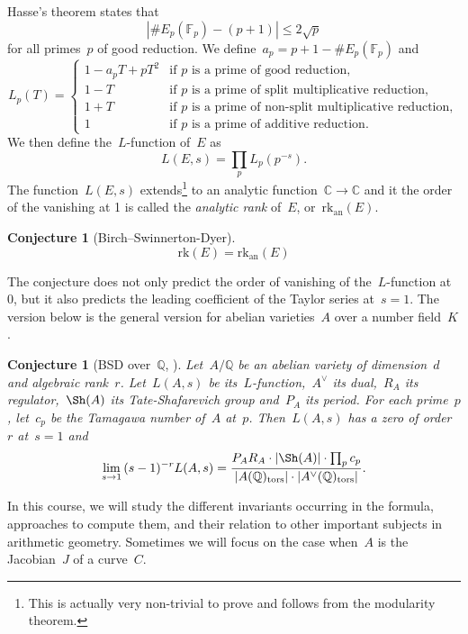 \documentclass[12pt]{article}
\newtheorem{conjecture}[theorem]{Conjecture}
\theoremstyle{definition}
\numberwithin{equation}{subsection}
\newcommand{\C}{\ensuremath{\mathbb{C}}}
\newcommand{\Q}{\ensuremath{\mathbb{Q}}}
\newcommand{\F}{\ensuremath{\mathbb{F}}}
\newcommand{\tors}{\mathrm{tors}}
\newcommand{\rkan}{\mathrm{rk}_{\mathrm{an}}}
\begin{document}
Hasse's theorem states that~$$|\# E_p(\F_p) - (p+1)| \leq 2\sqrt{p}$$ for all primes~$p$ of good reduction.
We define~$a_p = p+1 - \#E_p(\F_p)$ and
$$L_p(T) = \begin{cases}
1 - a_pT + pT^2 &\textrm{if~$p$ is a prime of good reduction},\\
1 - T &\textrm{if~$p$ is a prime of split multiplicative reduction},\\
1 + T &\textrm{if~$p$ is a prime of non-split multiplicative reduction},\\
1   &\textrm{if~$p$ is a prime of additive reduction}.
\end{cases}$$
We then define the~$L$-function of~$E$ as
$$L(E,s) = \prod_p L_p(p^{-s}).$$
The function~$L(E,s)$ extends\footnote{This is actually very non-trivial to prove and follows from the modularity theorem.} to an analytic function~$\C \to \C$ and it the order of the vanishing at 1 is called the {\em analytic rank} of~$E$, or~$\rkan(E)$.

\begin{conjecture}[Birch--Swinnerton-Dyer]
$$\mathrm{rk}(E) = \rkan(E)$$
\end{conjecture}

The conjecture does not only predict the order of vanishing of the~$L$-function at 0, but it also predicts the leading coefficient of the Taylor series at~$s = 1$.
The version below is the general version for abelian varieties~$A$ over a number field~$K$.

\begin{conjecture}[\textrm{BSD over~$\Q$, \cite[Conj.\ F.4.1.6, p.\ 462]{HindrySilverman}}]
Let~$A/\Q$ be an abelian variety of dimension~$d$ and algebraic rank~$r$. Let~$L(A,s)$ be its~$L$-function,~$A^{\vee}$ its dual,~$R_A$ its regulator,~$\Sh(A)$ its Tate-Shafarevich group and~$P_A$ its period. For each prime~$p$, let~$c_p$ be the Tamagawa number of~$A$ at~$p$.
Then~$L(A,s)$ has a zero of order~$r$ at~$s = 1$ and~\begin{equation}\label{eq:BSD}\lim_{s \rightarrow 1} {(s-1)^{-r} L(A,s)} = \frac{P_AR_A \cdot |\Sh(A)| \cdot \prod_{p} c_p}{|A(\Q)_{\tors}| \cdot |A^\vee(\Q)_{\tors}|}.\end{equation}
\end{conjecture}

In this course, we will study the different invariants occurring in the formula, approaches to compute them, and their relation to other important subjects in arithmetic geometry.
Sometimes we will focus on the case when~$A$ is the Jacobian~$J$ of a curve~$C$.
\end{document}
